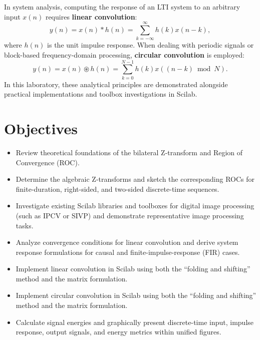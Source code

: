 \documentclass[12pt,a4paper]{article}
\begin{document}
In system analysis, computing the response of an LTI system to an arbitrary input $x(n)$ requires \textbf{linear convolution}:
\begin{equation}
    y(n) = x(n) * h(n) = \sum_{k=-\infty}^{\infty} h(k) x(n-k),
    \label{eq:lin_conv}
\end{equation}
where $h(n)$ is the unit impulse response. When dealing with periodic signals or block-based frequency-domain processing, \textbf{circular convolution} is employed:
\begin{equation}
    y(n) = x(n) \circledast h(n) = \sum_{k=0}^{N-1} h(k) x((n-k) \bmod N).
    \label{eq:circ_conv}
\end{equation}
In this laboratory, these analytical principles are demonstrated alongside practical implementations and toolbox investigations in Scilab.


\section{Objectives}
\begin{itemize}
    \item Review theoretical foundations of the bilateral Z-transform and Region of Convergence (ROC).
    \item Determine the algebraic Z-transforms and sketch the corresponding ROCs for finite-duration, right-sided, and two-sided discrete-time sequences.
    \item Investigate existing Scilab libraries and toolboxes for digital image processing (such as IPCV or SIVP) and demonstrate representative image processing tasks.
    \item Analyze convergence conditions for linear convolution and derive system response formulations for causal and finite-impulse-response (FIR) cases.
    \item Implement linear convolution in Scilab using both the ``folding and shifting'' method and the matrix formulation.
    \item Implement circular convolution in Scilab using both the ``folding and shifting'' method and the matrix formulation.
    \item Calculate signal energies and graphically present discrete-time input, impulse response, output signals, and energy metrics within unified figures.
\end{itemize}
\end{document}
